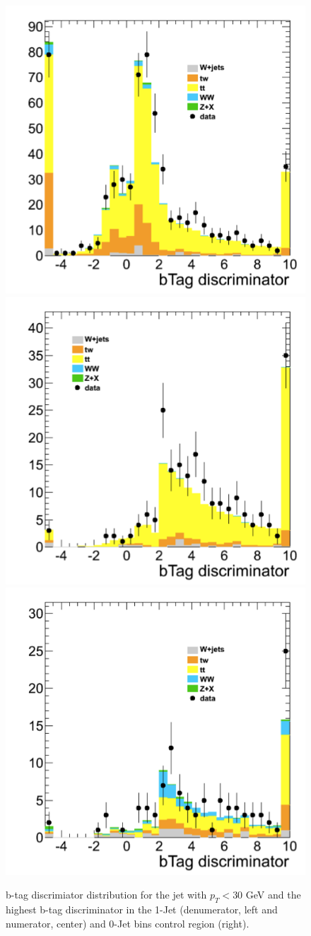 \begin{figure}[hbt]
\begin{center}
\includegraphics[width=0.3\linewidth]{figures/jetLowBtag_denum_dr.png} 
\includegraphics[width=0.3\linewidth]{figures/jetLowBtag_num_dr.png}
\includegraphics[width=0.3\linewidth]{figures/jetLowBtag_topTag_dr.png}
\caption{\label{fig:jetLowBtag}\protect b-tag discrimiator distribution for 
the jet with $p_T<30$ GeV and the highest b-tag discriminator in the 1-Jet (denumerator, left and numerator, center) 
and 0-Jet bins control region (right).}
\end{center}
\end{figure}
